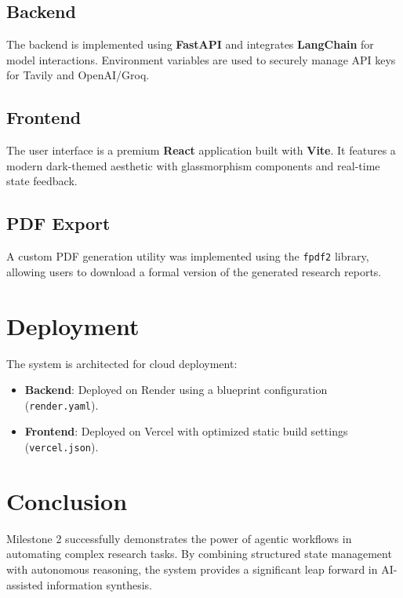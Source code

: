 \documentclass[12pt]{article}
\begin{document}
\subsection{Backend}
The backend is implemented using \textbf{FastAPI} and integrates \textbf{LangChain} for model interactions. Environment variables are used to securely manage API keys for Tavily and OpenAI/Groq.

\subsection{Frontend}
The user interface is a premium \textbf{React} application built with \textbf{Vite}. It features a modern dark-themed aesthetic with glassmorphism components and real-time state feedback.

\subsection{PDF Export}
A custom PDF generation utility was implemented using the \texttt{fpdf2} library, allowing users to download a formal version of the generated research reports.

\section{Deployment}
The system is architected for cloud deployment:
\begin{itemize}
    \item \textbf{Backend}: Deployed on Render using a blueprint configuration (\texttt{render.yaml}).
    \item \textbf{Frontend}: Deployed on Vercel with optimized static build settings (\texttt{vercel.json}).
\end{itemize}

\section{Conclusion}
Milestone 2 successfully demonstrates the power of agentic workflows in automating complex research tasks. By combining structured state management with autonomous reasoning, the system provides a significant leap forward in AI-assisted information synthesis.
\end{document}
